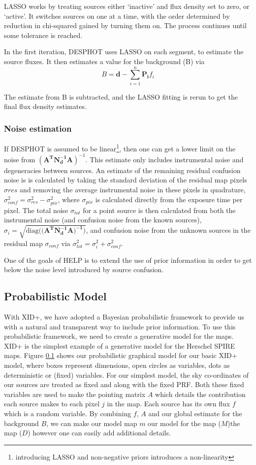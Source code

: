 \documentclass[useAMS,usenatbib]{mn2e}
\begin{document}
LASSO works by treating sources either `inactive' and flux density set to zero, or `active'. It switches sources on one at a time, with the order determined by reduction in chi-squared gained by turning them on. The process continues until some tolerance is reached.

In the first iteration, DESPHOT uses LASSO on each segment, to estimate the source fluxes. It then estimates a value for the background (B) via
\begin{equation}
B = \mathbf{d} - \sum\limits_{i=1}^n \mathbf{P_i}f_i
\end{equation} 

The estimate from B is subtracted, and the LASSO fitting is rerun to get the final flux density estimates.
\subsubsection{Noise estimation}
If DESPHOT is assumed to be linear\footnote{introducing LASSO and non-negative priors introduces a non-linearity}, then one can get a lower limit on the noise from $(\mathbf{A^TN_d^{-1}A})^{-1}$. This estimate only includes instrumental noise and degeneracies between sources. An estimate of the remaining residual confusion noise is is calculated by taking the standard deviation of the residual map pixels $\sigma{res}$ and removing the average instrumental noise in these pixels in quadrature, $\sigma^2_{conf} = \sigma^2_{res} - \sigma^2_{pix}$, where $\sigma_{pix}$ is calculated directly from the exposure time per pixel. The total noise $\sigma_{tot}$ for a point source is then calculated from both the instrumental noise (and confusion noise from the known sources), $\sigma_{i} = \sqrt{\mathrm{diag}((\mathbf{A^TN^{-1}_dA)^{-1})}}$, and confusion noise from the unknown sources in the residual map $\sigma_{conf}$ via $\sigma^2_{tot} = \sigma^2_{i} + \sigma^2_{conf}$. 
 
 
 One of the goals of HELP is to extend the use of prior information in order to get below the noise level introduced by source confusion.
\subsection{Probabilistic Model}
With XID+, we have adopted a Bayesian probabilistic framework to provide us with a natural and transparent way to include prior information. To use this probabilistic framework, we need to create a generative model for the maps. XID+ is the simplest example of a generative model for the Herschel SPIRE maps. Figure \ref{} shows our probabilistic graphical model for our basic XID+ model, where boxes represent dimensions, open circles as variables, dots as deterministic or (fixed) variables. For our simplest model, the sky co-ordinates of our sources are treated as fixed and along with the fixed PRF. Both these fixed variables are used to make the pointing matrix $A$ which details the contribution each source makes to each pixel $j$ in the map. Each source has its own flux $f$ which is a random variable. By combining $f$, $A$ and our global estimate for the background $B$, we can make our model map $m$   our model for the map ($M$)the map ($D$) however one can easily add additional details. 
\end{document}
